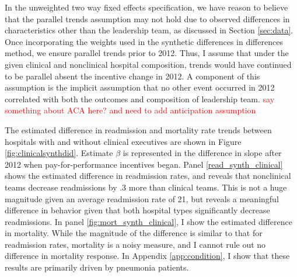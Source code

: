 \documentclass[12pt]{article}
\begin{document}
    In the unweighted two way fixed effects specification, we have reason to believe that the parallel trends assumption may not hold due to observed differences in characteristics other than the leadership team, as discussed in Section \ref{sec:data}. Once incorporating the weights used in the synthetic differences in differences method, we ensure parallel trends prior to 2012. Thus, I assume that under the given clinical and nonclinical hospital composition, trends would have continued to be parallel absent the incentive change in 2012. A component of this assumption is the implicit assumption that no other event occurred in 2012 correlated with both the outcomes and composition of leadership team. \textcolor{red}{say something about ACA here? and need to add anticipation assumption}

    The estimated difference in readmission and mortality rate trends between hospitals with and without clinical executives are shown in Figure \ref{fig:clinicalsynthdid}. Estimate $\beta$ is represented in the difference in slope after 2012 when pay-for-performance incentives began. Panel \ref{read_synth_clinical} shows the estimated difference in readmission rates, and reveals that nonclinical teams decrease readmissions by .3 more than clinical teams. This is not a huge magnitude given an average readmission rate of 21, but reveals a meaningful difference in behavior given that both hospital types significantly decrease readmissions. In panel \ref{fig:mort_synth_clinical}, I show the estimated difference in mortality. While the magnitude of the difference is similar to that for readmission rates, mortality is a noisy measure, and I cannot rule out no difference in mortality response. In Appendix \ref{app:condition}, I show that these results are primarily driven by pneumonia patients.  
\end{document}
